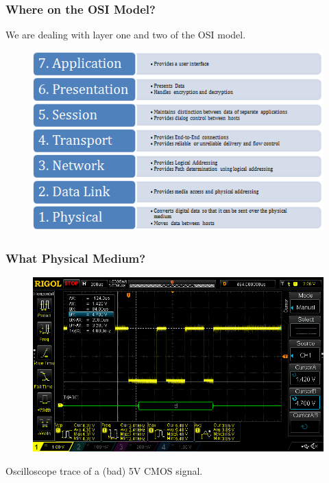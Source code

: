 \documentclass[t]{beamer}
\begin{document}

\begin{frame}[t]
\frametitle{Where on the OSI Model?}
We are dealing with layer one and two of the OSI model. 
\begin{figure}
	\includegraphics[width=0.8\linewidth]{osiModel.png}
\end{figure}

\end{frame}


\begin{frame}[t]
\frametitle{What Physical Medium?}
\begin{figure}
	\includegraphics[width=0.9\linewidth]{badSerial.png}
\end{figure}
Oscilloscope trace of a (bad) 5V CMOS signal. 
\end{frame}

\end{document}
